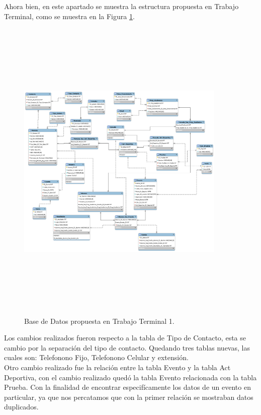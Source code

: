 	\noindent Ahora bien, en este apartado se muestra la estructura propuesta en Trabajo Terminal, como se muestra en la Figura \ref{basededatosInicial}. 
	\pagebreak
	
	\begin{figure}[hbt!]
		\centering
		\includegraphics[angle=90, width=10cm, height=15cm]{Imagenes/BasedeDatos}
		\caption{Base de Datos propuesta en Trabajo Terminal 1.}
		\label{basededatosInicial}
	\end{figure}
	
	\noindent Los cambios realizados fueron respecto a la tabla de Tipo de Contacto, esta se cambio por la separación del tipo de contacto. Quedando tres tablas nuevas, las cuales son: Telefonono Fijo, Telefonono Celular y extensión. \\
	Otro cambio realizado fue la relación entre la tabla Evento y la tabla Act Deportiva, con el cambio realizado quedó la tabla Evento relacionada con la tabla Prueba. Con la finalidad de encontrar especifícamente los datos de un evento en particular, ya que nos percatamos que con la primer relación se mostraban datos duplicados. 
	
